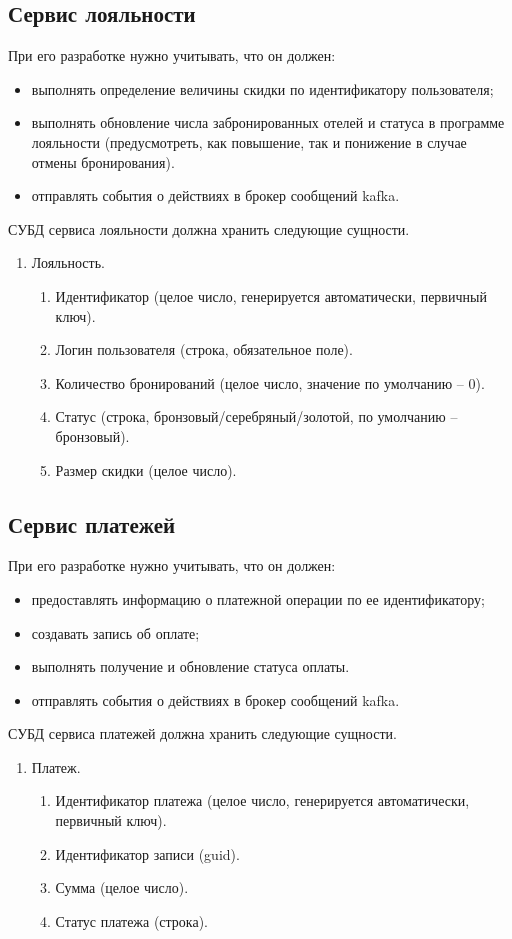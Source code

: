 \subsection{Сервис лояльности}
При его разработке нужно учитывать, что он должен:
\begin{itemize}
	\item выполнять определение величины скидки по идентификатору пользователя;
	\item выполнять обновление числа забронированных отелей и статуса в программе лояльности (предусмотреть, как повышение, так и понижение в случае отмены бронирования).
	\item отправлять события о действиях в брокер сообщений kafka.
\end{itemize}
СУБД сервиса лояльности должна хранить следующие сущности.
\begin{enumerate}
	\item Лояльность.
	\begin{enumerate}
		\item Идентификатор (целое число, генерируется автоматически, первичный ключ).
		\item Логин пользователя (строка, обязательное поле).
		\item Количество бронирований (целое число, значение по умолчанию – 0).
		\item Статус (строка, бронзовый/серебряный/золотой, по умолчанию – бронзовый).
		\item Размер скидки (целое число).
	\end{enumerate}
\end{enumerate}

\subsection{Сервис платежей}
При его разработке нужно учитывать, что он должен:
\begin{itemize}
	\item предоставлять информацию о платежной операции по ее идентификатору;
	\item создавать запись об оплате;
	\item выполнять получение и обновление статуса оплаты.
	\item отправлять события о действиях в брокер сообщений kafka.
\end{itemize}
СУБД сервиса платежей должна хранить следующие сущности.
\begin{enumerate}
	\item Платеж.
	\begin{enumerate}
		\item Идентификатор платежа (целое число, генерируется автоматически, первичный ключ).
		\item Идентификатор записи (guid).
		\item Сумма (целое число).
		\item Статус платежа (строка).
	\end{enumerate}
\end{enumerate}

